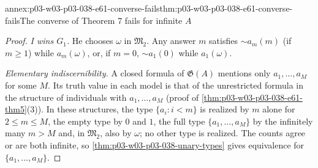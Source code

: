 \begin{annexitem}{annex:p03-w03-p03-038-e61-converse-fails}{thm:p03-w03-p03-038-e61-converse-fails}{The converse of Theorem 7 fails for infinite \(A\)}
\begin{proof}
\emph{I wins \(G_1\).} He chooses \(\omega\) in \(\mathfrak M_2\). Any
answer \(m\) satisfies \(\sim a_m(m)\) (if \(m\ge1\)) while \(a_m(\omega)\),
or, if \(m=0\), \(\sim a_1(0)\) while \(a_1(\omega)\).

\emph{Elementary indiscernibility.} A closed formula of \(\mathfrak G(A)\)
mentions only \(a_1,\ldots,a_M\) for some \(M\). Its truth value in each
model is that of the unrestricted formula in the structure of individuals
with \(a_1,\ldots,a_M\) (proof of \cref{thm:p03-w03-p03-038-e61-thm5}(3)).
In these structures, the type \(\{a_i:i<m\}\) is realized by \(m\) alone for
\(2\le m\le M\), the empty type by \(0\) and \(1\), the full type
\(\{a_1,\ldots,a_M\}\) by the infinitely many \(m>M\) and, in
\(\mathfrak M_2\), also by \(\omega\); no other type is realized. The counts
agree or are both infinite, so \cref{thm:p03-w03-p03-038-unary-types} gives
equivalence for \(\{a_1,\ldots,a_M\}\).
\end{proof}
\end{annexitem}

